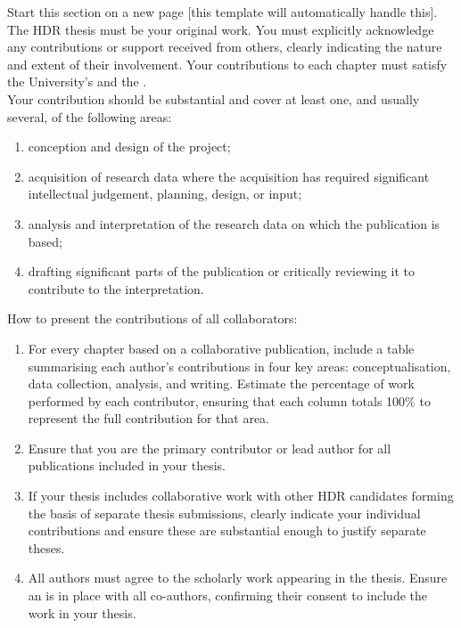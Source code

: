 \begin{instructional}

	Start this section on a new page [this template will automatically handle this].\\

	\noindent
	The HDR thesis must be your original work. You must explicitly acknowledge any contributions or support received from others, clearly indicating the nature and extent of their involvement. Your contributions to each chapter must satisfy the University’s \href{https://policies.uq.edu.au/document/view-current.php?id=377}{\color{blue}{Authorship Procedure}} and the \href{https://policies.uq.edu.au/document/view-current.php?id=248}{\color{blue}{HDR Examination Procedure}}.  \\

    \noindent
    Your contribution should be substantial and cover at least one, and usually several, of the following areas:
    \begin{enumerate}
        \item conception and design of the project;
        \item acquisition of research data where the acquisition has required significant intellectual judgement, planning, design, or input;
        \item analysis and interpretation of the research data on which the publication is based;
        \item drafting significant parts of the publication or critically reviewing it to contribute to the interpretation.
    \end{enumerate}

    \noindent
    How to present the contributions of all collaborators:
    \begin{enumerate}
        \item For every chapter based on a collaborative publication, include a table summarising each author’s contributions in four key areas: conceptualisation, data collection, analysis, and writing. Estimate the percentage of work performed by each contributor, ensuring that each column totals 100\% to represent the full contribution for that area.
        \item Ensure that you are the primary contributor or lead author for all publications included in your thesis.
        \item If your thesis includes collaborative work with other HDR candidates forming the basis of separate thesis submissions, clearly indicate your individual contributions and ensure these are substantial enough to justify separate theses.
        \item All authors must agree to the scholarly work appearing in the thesis. Ensure an \href{https://policies.uq.edu.au/document/view-current.php?id=377}{\color{blue}{authorship agreement}} is in place with all co-authors, confirming their consent to include the work in your thesis.
    \end{enumerate}
    

\end{instructional}
